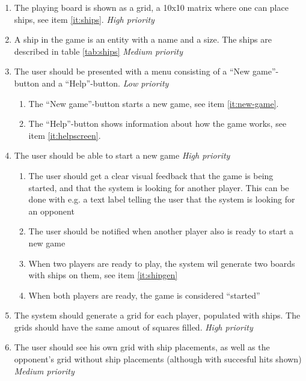 \begin{enumerate}[label= {\bf FR \arabic*}]
    \item \label{it:grid} The playing board is shown as a grid, a 10x10 matrix where one can place ships, see item \ref{it:ships}. \textit{High priority}
    \item \label{it:ships} A ship in the game is an entity with a name and a size. The ships are described in table \ref{tab:ships}  \textit{Medium priority}

    \item  \label{it:buttons}The user should be presented with a menu consisting of a ``New game''-button and a ``Help''-button.  \textit{Low priority}
        \begin{enumerate}[label= {\bf \ref{it:buttons}.\arabic*}]
            \item The ``New game''-button starts a new game, see  item \ref{it:new-game}.
            \item The ``Help''-button shows information about how the game works, see item \ref{it:helpscreen}.
        \end{enumerate}
    \item  \label{it:new-game} The user should be able to start a new game \textit{High priority}
        \begin{enumerate}[label= {\bf \ref{it:new-game}.\arabic*}]
            \item The user should get a clear visual feedback that the game is being started, and that the system is looking for another player. This can be done with e.g. a text label telling the user that the system is looking for an opponent
            \item The user should be notified when another player also is ready to start a new  game
            \item When two players are ready to play, the system wil generate two boards with ships on them, see item \ref{it:shipgen}
            \item When both players are ready, the game is considered ``started''
        \end{enumerate}
    \item \label{it:shipgen} The system should generate a grid for each player, populated with ships. The grids should have the same amout of squares filled. \textit{High priority}
    \item The user should see his own grid with ship placements, as well as the opponent's grid without ship placements (although with succesful hits shown) \textit{Medium priority}

\end{enumerate}
